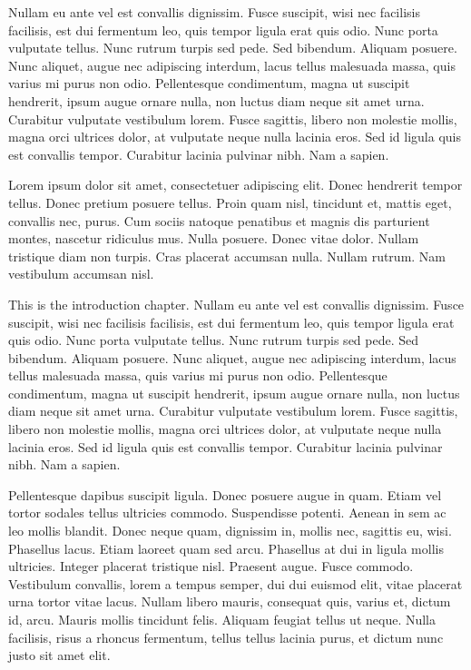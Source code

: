 \documentclass{hacett-socsci-thesis}
\begin{document}
Nullam eu ante vel est convallis dignissim.  Fusce suscipit, wisi nec
facilisis facilisis, est dui fermentum leo, quis tempor ligula erat
quis odio.  Nunc porta vulputate tellus.  Nunc rutrum turpis sed pede.
Sed bibendum.  Aliquam posuere.  Nunc aliquet, augue nec adipiscing
interdum, lacus tellus malesuada massa, quis varius mi purus non odio.
Pellentesque condimentum, magna ut suscipit hendrerit, ipsum augue
ornare nulla, non luctus diam neque sit amet urna.  Curabitur
vulputate vestibulum lorem.  Fusce sagittis, libero non molestie
mollis, magna orci ultrices dolor, at vulputate neque nulla lacinia
eros.  Sed id ligula quis est convallis tempor.  Curabitur lacinia
pulvinar nibh.  Nam a sapien.

Lorem ipsum dolor sit amet, consectetuer adipiscing elit.  Donec
hendrerit tempor tellus.  Donec pretium posuere tellus.  Proin quam
nisl, tincidunt et, mattis eget, convallis nec, purus.  Cum sociis
natoque penatibus et magnis dis parturient montes, nascetur ridiculus
mus.  Nulla posuere.  Donec vitae dolor.  Nullam tristique diam non
turpis.  Cras placerat accumsan nulla.  Nullam rutrum.  Nam vestibulum
accumsan nisl.

\HSTmainmatter

\HSTintro
This is the introduction chapter. Nullam eu ante vel est convallis
dignissim.  Fusce suscipit, wisi nec facilisis facilisis, est dui
fermentum leo, quis tempor ligula erat quis odio.  Nunc porta
vulputate tellus.  Nunc rutrum turpis sed pede.  Sed bibendum.
Aliquam posuere.  Nunc aliquet, augue nec adipiscing interdum, lacus
tellus malesuada massa, quis varius mi purus non odio.  Pellentesque
condimentum, magna ut suscipit hendrerit, ipsum augue ornare nulla,
non luctus diam neque sit amet urna.  Curabitur vulputate vestibulum
lorem.  Fusce sagittis, libero non molestie mollis, magna orci
ultrices dolor, at vulputate neque nulla lacinia eros.  Sed id ligula
quis est convallis tempor.  Curabitur lacinia pulvinar nibh.  Nam a
sapien.

Pellentesque dapibus suscipit ligula.  Donec posuere augue in quam.
Etiam vel tortor sodales tellus ultricies commodo.  Suspendisse
potenti.  Aenean in sem ac leo mollis blandit.  Donec neque quam,
dignissim in, mollis nec, sagittis eu, wisi.  Phasellus lacus.  Etiam
laoreet quam sed arcu.  Phasellus at dui in ligula mollis ultricies.
Integer placerat tristique nisl.  Praesent augue.  Fusce commodo.
Vestibulum convallis, lorem a tempus semper, dui dui euismod elit,
vitae placerat urna tortor vitae lacus.  Nullam libero mauris,
consequat quis, varius et, dictum id, arcu.  Mauris mollis tincidunt
felis.  Aliquam feugiat tellus ut neque.  Nulla facilisis, risus a
rhoncus fermentum, tellus tellus lacinia purus, et dictum nunc justo
sit amet elit.
\end{document}
